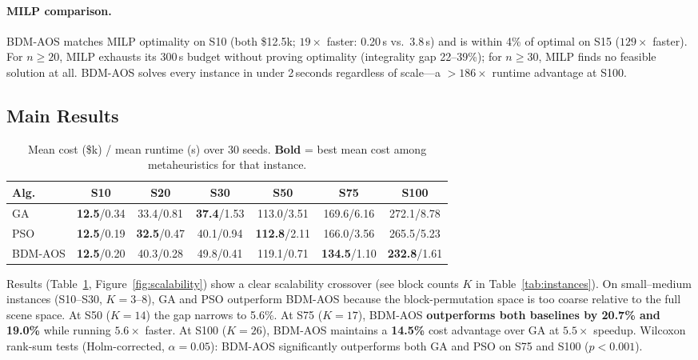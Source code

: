 \paragraph{MILP comparison.}
BDM-AOS matches MILP optimality on S10 (both \$12.5k; $19\times$ faster: 0.20\,s vs.\ 3.8\,s) and is within 4\% of optimal on S15 ($129\times$ faster).
For $n \geq 20$, MILP exhausts its 300\,s budget without proving optimality (integrality gap 22--39\%); for $n \geq 30$, MILP finds no feasible solution at all.
BDM-AOS solves every instance in under 2\,seconds regardless of scale---a ${>}186\times$ runtime advantage at S100.

\subsection{Main Results}

\begin{table}[t]
\centering
\caption{Mean cost (\$k) / mean runtime (s) over 30 seeds.
         \textbf{Bold} = best mean cost among metaheuristics for that instance.}
\label{tab:results}
\small
{\setlength{\tabcolsep}{4pt}
\begin{tabular}{@{}lcccccc@{}}
\toprule
\textbf{Alg.} & \textbf{S10} & \textbf{S20} & \textbf{S30}
              & \textbf{S50} & \textbf{S75} & \textbf{S100} \\
\midrule
GA      & \textbf{12.5}/0.34 & 33.4/0.81          & \textbf{37.4}/1.53
        & 113.0/3.51         & 169.6/6.16         & 272.1/8.78 \\
PSO     & \textbf{12.5}/0.19 & \textbf{32.5}/0.47 & 40.1/0.94
        & \textbf{112.8}/2.11 & 166.0/3.56        & 265.5/5.23 \\
BDM-AOS & \textbf{12.5}/0.20 & 40.3/0.28          & 49.8/0.41
        & 119.1/0.71         & \textbf{134.5}/1.10 & \textbf{232.8}/1.61 \\
\bottomrule
\end{tabular}}
\end{table}

Results (Table~\ref{tab:results}, Figure~\ref{fig:scalability}) show a clear scalability crossover (see block counts $K$ in Table~\ref{tab:instances}).
On small--medium instances (S10--S30, $K{=}3$--$8$), GA and PSO outperform BDM-AOS because the block-permutation space is too coarse relative to the full scene space.
At S50 ($K{=}14$) the gap narrows to 5.6\%.
At S75 ($K{=}17$), BDM-AOS \textbf{outperforms both baselines by 20.7\% and 19.0\%} while running $5.6\times$ faster.
At S100 ($K{=}26$), BDM-AOS maintains a \textbf{14.5\%} cost advantage over GA at $5.5\times$ speedup.
Wilcoxon rank-sum tests (Holm-corrected, $\alpha{=}0.05$): BDM-AOS significantly outperforms both GA and PSO on S75 and S100 ($p < 0.001$).


